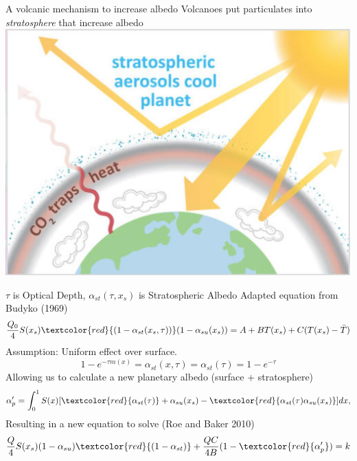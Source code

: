 \documentclass[11pt]{beamer}
\begin{document}
\begin{frame}{A volcanic mechanism to increase albedo}
    Volcanoes put particulates into \emph{stratosphere} that increase albedo
    \centering
    \includegraphics[width=.9\textwidth,height=.9\textheight,keepaspectratio]{img/strat_aerosol_diagram.jpg}
\end{frame}

\begin{frame}{$\tau$ is Optical Depth, $\alpha_{st}(\tau, x_s)$ is Stratospheric Albedo}
    Adapted equation from Budyko (1969)
    $$\frac{Q_0}{4} S(x_s)\textcolor{red}{(1-\alpha_{st}(x_s, \tau))}(1-\alpha_{su}(x_s)) = A + BT(x_s) + C (T(x_s)-\bar{T})$$
    \pause
    Assumption: Uniform effect over surface.
    $$1- e^{-\tau m(x)} = \alpha_{st}(x, \tau) = \alpha_{st}(\tau) = 1- e^{-\tau}$$
    \pause
    Allowing us to calculate a new planetary albedo (surface + stratosphere)
    $$ \alpha_p' = \int_0^1 S(x) [\textcolor{red}{\alpha_{st}(\tau)} + \alpha_{su}(x_s) - \textcolor{red}{\alpha_{st}(\tau)\alpha_{su}(x_s)}] dx,$$
    \pause
    Resulting in a new equation to solve (Roe and Baker 2010)
    $$\frac{Q}{4}S(x_s)(1-\alpha_{su})\textcolor{red}{(1-\alpha_{st})} + \frac{QC}{4B}(1-\textcolor{red}{\alpha_p'}) = k$$
\end{frame}
\end{document}
